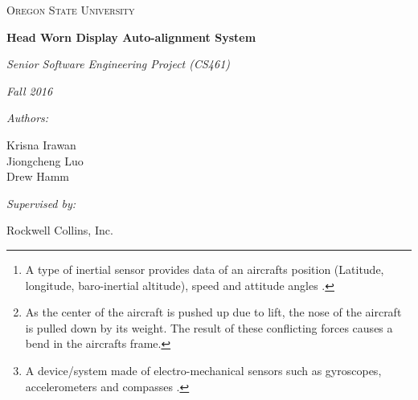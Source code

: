 \documentclass[letterpaper,10pt,notitlepage]{article}
\def\name{Krisna Irawan\\ Jiongcheng Luo\\ Drew Hamm}
\begin{document}
\begin{titlepage}
	\centering
	{\scshape\LARGE Oregon State University\par}
	\vspace{2cm}
	{\huge\bfseries Head Worn Display Auto-alignment System\par}
	\vspace{2cm}
	{\Large\itshape Senior Software Engineering Project (CS461)\par}
	{\Large\itshape Fall 2016\par}
	\vspace{1cm}
	{\normalsize\itshape Authors:\par}
	{\normalsize \name\par}
	\vspace{1cm}
	{\normalsize\itshape Supervised by:\par}
	{\normalsize Rockwell Collins, Inc.\par}
	\vspace{3cm}

	\begin{abstract}
	A Head-up Display (HUD), is a transparent display that presents all necessary data that pilots need in their flight environment. Currently, the HUD obtains data from an aircraft\textquotesingle s mounted device called inertial reference unit (IRU)\footnote{A type of inertial sensor provides data of an aircraft\textquotesingle s position (Latitude, longitude, baro-inertial altitude), speed and attitude angles \cite{iru}.}, this IRU outputs precise and aligned data to the HUD. However, the current alignment process requires specialized equipment and epoxy which is time consuming, costly, and interrupts production line progress for the original equipment manufacturer. In addition, the resulting HUD alignment, while precise, does not compensate for airframe droop\footnote{As the center of the aircraft is pushed up due to lift, the nose of the aircraft is pulled down by its weight. The result of these conflicting forces causes a bend in the aircraft\textquotesingle s frame. } during flight. Rockwell Collins looks forward to a new alignment methodology utilizing an inexpensive microelectromechanical systems (MEMS)\footnote{A device/system made of electro-mechanical sensors such as gyroscopes, accelerometers and compasses \cite{mems}.} IRU mounted onto the HUD to infer alignment data from the aircraft\textquotesingle s precisely mounted and aligned IRU. This project works on a solution that utilizes the data from both the inexpensive MEMS IRU and the aircraft mounted IRU to develop an algorithm, which aims to output precise and aligned data with reduced installation cost.
\end{abstract}
\end{titlepage}
\end{document}
